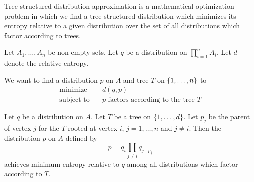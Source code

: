 
\sbasic



























\sstart
{}



Tree-structured distribution
approximation is a mathematical
optimization problem in which we
find a tree-structured distribution
which minimizes its entropy relative
to a given distribution over the set
of all distributions which factor
according to trees.


Let $A_1, \dots, A_n$ be
non-empty sets.
Let $q$ be a distribution on
$\prod_{i = 1}^{n} A_i$.
Let $d$ denote the relative
entropy.

We want to find a distribution $p$
on $A$ and tree $T$ on
$\{1, \dots, n\}$ to
\[
  \begin{aligned}
    \text{minimize}   &\quad d(q, p) \\
    \text{subject to} &\quad p \text{ factors according to the tree } T
  \end{aligned}
\]


\begin{prop}
  Let $q$ be a distribution on $A$. Let $T$ be
  a tree on $\{1, \dots, d\}$. Let $p_j$ be
  the parent of vertex $j$ for the $T$ rooted
  at vertex $i$, $j = 1,\dots,n$ and $j \neq i$.
  Then the distribution $p$ on $A$ defined by
  \[
    p = q_i \prod_{j \neq i} q_{j \mid p_j}
  \]
  achieves minimum entropy relative to $q$ among
  all distributions which factor according to $T$.
\end{prop}

